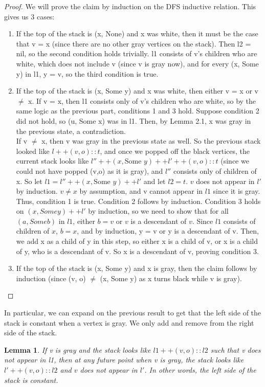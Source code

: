 \documentclass{article}
\newtheorem{lemma}[theorem]{Lemma}
\begin{document}
\begin{proof}
We will prove the claim by induction on the DFS inductive relation. This gives us 3 cases:
\begin{enumerate}
\item
If the top of the stack is (x, None) and x was white, then it must be the case that v = x (since there are no other gray vertices on the stack). Then l2 = nil, so the second condition holds trivially. l1 consists of v's children who are white, which does not include v (since v is gray now), and for every (x, Some y) in l1, y = v, so the third condition is true.
\item
If the top of the stack is (x, Some y) and x was white, then either v = x or v $\neq$ x. If v = x, then l1 consists only of v's children who are white, so by the same logic as the previous part, conditions 1 and 3 hold. Suppose condition 2 did not hold, so (u, Some x) was in l1. Then, by Lemma 2.1, x was gray in the previous state, a contradiction.
\\If v $\neq$ x, then v was gray in the previous state as well. So the previous stack looked like $l ++ (v, o) :: t$, and once we popped off the black vertices, the current stack looks like $l'' ++ (x, \text{Some }y) ++ l' ++ (v, o) :: t$ (since we could not have popped (v,o) as it is gray), and $l''$ consists only of children of x. So let $l1=l'' ++ (x, \text{Some }y) ++ l'$ and let $l2 = t$.  $v$ does not appear in $l'$ by induction. $v \neq x$ by assumption, and v cannot appear in $l1$ since it is gray. Thus, condition 1 is true. Condition 2 follows by induction. Condition 3 holds on $(x, Some y) ++ l'$ by induction, so we need to show that for all $(a, Some b)$ in $l1$, either $b=v$ or $v$ is a descendant of $v$. Since $l1$ consists of children of $x$, $b=x$, and by induction, y = v or y is a descendant of v. Then, we add x as a child of y in this step, so either x is a child of v, or x is a child of y, who is a descendant of v. So x is a descendant of v, proving condition 3.
\item
If the top of the stack is (x, Some y) and x is gray, then the claim follows by induction (since (v, o) $\neq$ (x, Some y) as x turns black while v is gray).
\end{enumerate}
\end{proof}
In particular, we can expand on the previous result to get that the left side of the stack is constant when a vertex is gray. We only add and remove from the right side of the stack.
\begin{lemma}
If v is gray and the stack looks like $l1 ++ (v, o) :: l2$ such that v does not appear in l1, then at any future point when v is gray, the stack looks like $l' ++ (v, o) :: l2$ and $v$ does not appear in $l'$. In other words, the left side of the stack is constant.
\end{lemma}
\end{document}
